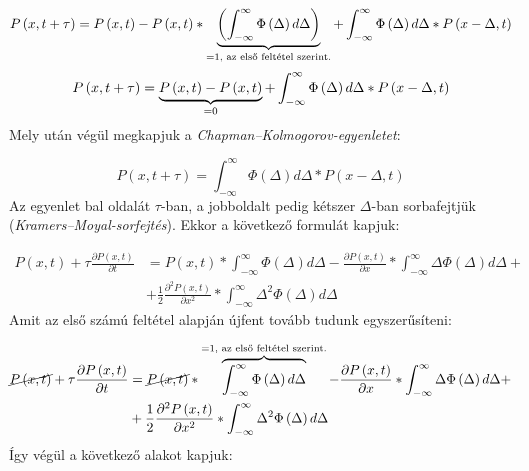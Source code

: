 \begin{equation}
    P \left( x, t + \tau \right)
    =
    P \left( x, t \right)
    -
    P \left( x, t \right) * \underbrace{\left( \int_{-\infty}^{\infty} \Phi \left( \Delta \right) d \Delta \right)}_{\text{\normalfont =1, az első feltétel szerint.}}
    +
    \int_{-\infty}^{\infty} \Phi \left( \Delta \right) d \Delta * P \left( x - \Delta, t \right)
\end{equation}
\begin{equation}
    P \left( x, t + \tau \right)
    =
    \underbrace{P \left( x, t \right)
    -
    P \left( x, t \right)}_{\text{\normalfont =0}}
    +
    \int_{-\infty}^{\infty} \Phi \left( \Delta \right) d \Delta * P \left( x - \Delta, t \right)
\end{equation}
Mely után végül megkapjuk a \emph{Chapman--Kolmogorov-egyenletet}:

\begin{equation}
    \boxed{P \left( x, t + \tau \right)
    =
    \int_{-\infty}^{\infty} \Phi \left( \Delta \right) d \Delta * P \left( x - \Delta, t \right)}
\end{equation}
Az egyenlet bal oldalát $\tau$-ban, a jobboldalt pedig kétszer $\Delta$-ban sorbafejtjük (\emph{Kramers--Moyal-sorfejtés}). Ekkor a következő formulát kapjuk:

\begin{align}
    P \left( x, t \right) + \tau \frac{\partial P \left( x, t \right)}{\partial t}
    &=
    P \left( x, t \right) * \int_{-\infty}^{\infty} \Phi \left( \Delta \right) d \Delta
    -
    \frac{\partial P \left( x, t \right)}{\partial x} * \int_{-\infty}^{\infty} \Delta \Phi \left( \Delta \right) d \Delta + \nonumber \\
    &+
    \frac{1}{2} \frac{\partial^{2} P \left( x, t \right)}{\partial x^{2}} * \int_{-\infty}^{\infty} \Delta^{2} \Phi \left( \Delta \right) d \Delta
\end{align}
Amit az első számú feltétel alapján újfent tovább tudunk egyszerűsíteni:

\begin{align}
    \cancel{P \left( x, t \right)} + \tau \frac{\partial P \left( x, t \right)}{\partial t}
    &=
    \cancel{P \left( x, t \right)} * \overbrace{\int_{-\infty}^{\infty} \Phi \left( \Delta \right) d \Delta}^{\text{\normalfont =1, az első feltétel szerint.}}
    -
    \frac{\partial P \left( x, t \right)}{\partial x} * \int_{-\infty}^{\infty} \Delta \Phi \left( \Delta \right) d \Delta + \nonumber \\
    &+
    \frac{1}{2} \frac{\partial^{2} P \left( x, t \right)}{\partial x^{2}} * \int_{-\infty}^{\infty} \Delta^{2} \Phi \left( \Delta \right) d \Delta
\end{align}
Így végül a következő alakot kapjuk:


